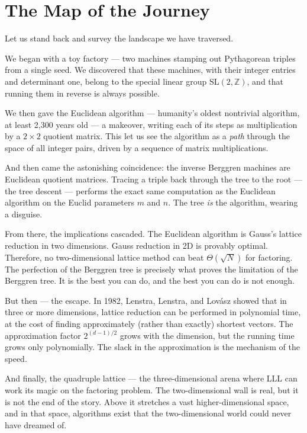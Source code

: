 \bigskip

\section*{The Map of the Journey}

Let us stand back and survey the landscape we have traversed.

We began with a toy factory --- two machines stamping out Pythagorean triples from a single seed. We discovered that these machines, with their integer entries and determinant one, belong to the special linear group $\mathrm{SL}(2, \mathbb{Z})$, and that running them in reverse is always possible.

We then gave the Euclidean algorithm --- humanity's oldest nontrivial algorithm, at least 2,300 years old --- a makeover, writing each of its steps as multiplication by a $2 \times 2$ quotient matrix. This let us see the algorithm as a \textit{path} through the space of all integer pairs, driven by a sequence of matrix multiplications.

And then came the astonishing coincidence: the inverse Berggren machines are Euclidean quotient matrices. Tracing a triple back through the tree to the root --- the tree descent --- performs the exact same computation as the Euclidean algorithm on the Euclid parameters $m$ and $n$. The tree \textit{is} the algorithm, wearing a disguise.

From there, the implications cascaded. The Euclidean algorithm is Gauss's lattice reduction in two dimensions. Gauss reduction in 2D is provably optimal. Therefore, no two-dimensional lattice method can beat $\Theta(\sqrt{N})$ for factoring. The perfection of the Berggren tree is precisely what proves the limitation of the Berggren tree. It is the best you can do, and the best you can do is not enough.

But then --- the escape. In 1982, Lenstra, Lenstra, and Lovász showed that in three or more dimensions, lattice reduction can be performed in polynomial time, at the cost of finding approximately (rather than exactly) shortest vectors. The approximation factor $2^{(d-1)/2}$ grows with the dimension, but the running time grows only polynomially. The slack in the approximation is the mechanism of the speed.

And finally, the quadruple lattice --- the three-dimensional arena where LLL can work its magic on the factoring problem. The two-dimensional wall is real, but it is not the end of the story. Above it stretches a vast higher-dimensional space, and in that space, algorithms exist that the two-dimensional world could never have dreamed of.


